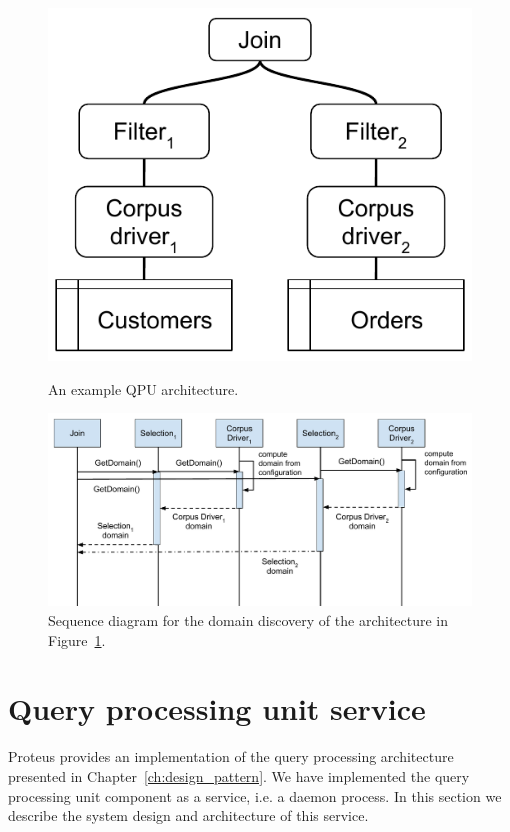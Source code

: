 \begin{figure}
    \centering
    \begin{minipage}{.3\textwidth}
        \centering
        \includegraphics[scale=0.5]{./figures/design_pattern/qpu_graph_emergent_properties.pdf}
        \caption{An example QPU architecture.}
        \label{fig:domain_example_graph}
    \end{minipage}%
    \begin{minipage}{.7\textwidth}
        \centering
        \includegraphics[scale=0.4]{./figures/proteus/domain_sequence_diag.pdf}
        \caption{Sequence diagram for the domain discovery of the architecture in Figure~\ref{fig:domain_sequence_diag}.}
        \label{fig:domain_sequence_diag}
    \end{minipage}
\end{figure}


\section{Query processing unit service}
\label{sec:proteus_qpu_architecture}
Proteus provides an implementation of the query processing architecture presented in Chapter~\ref{ch:design_pattern}.
We have implemented the query processing unit component as a service, i.e. a daemon process.
In this section we describe the system design and architecture of this service.

